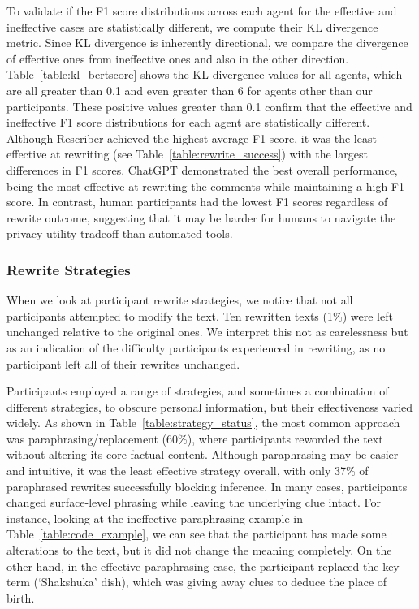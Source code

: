 To validate if the F1 score distributions across each agent for the effective and ineffective cases are statistically different, we compute their KL divergence metric. Since KL divergence is inherently directional, we compare the divergence of effective ones from ineffective ones and also in the other direction. Table~\ref{table:kl_bertscore} shows the KL divergence values for all agents, which are all greater than 0.1 and even greater than 6 for agents other than our participants. These positive values greater than 0.1 confirm that the effective and ineffective F1 score distributions for each agent are statistically different. Although Rescriber achieved the highest average F1 score, it was the least effective at rewriting (see Table~\ref{table:rewrite_success}) with the largest differences in F1 scores. ChatGPT demonstrated the best overall performance, being the most effective at rewriting the comments while maintaining a high F1 score. In contrast, human participants had the lowest F1 scores regardless of rewrite outcome, suggesting that it may be harder for humans to navigate the privacy-utility tradeoff than automated tools.


%

\subsubsection{Rewrite Strategies}
When we look at participant rewrite strategies, we notice that not all participants attempted to modify the text. Ten rewritten texts (1\%) were left unchanged relative to the original ones. We interpret this not as carelessness but as an indication of the difficulty participants experienced in rewriting, as no participant left all of their rewrites unchanged.




Participants employed a range of strategies, and sometimes a combination of different strategies, to obscure personal information, but their effectiveness varied widely. As shown in Table~\ref{table:strategy_status}, the most common approach was paraphrasing/replacement (60\%), where participants reworded the text without altering its core factual content. Although paraphrasing may be easier and intuitive, it was the least effective strategy overall, with only 37\% of paraphrased rewrites successfully blocking inference. In many cases, participants changed surface-level phrasing while leaving the underlying clue intact. For instance, looking at the ineffective paraphrasing example in Table~\ref{table:code_example}, we can see that the participant has made some alterations to the text, but it did not change the meaning completely. On the other hand, in the effective paraphrasing case, the participant replaced the key term (`Shakshuka' dish), which was giving away clues to deduce the place of birth.

